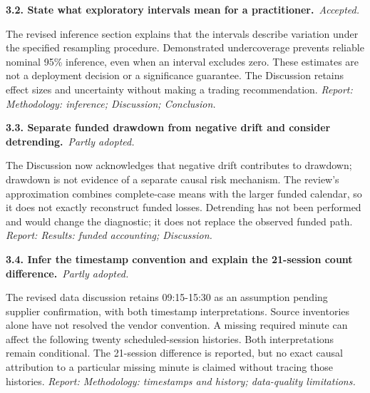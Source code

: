 \documentclass[11pt,a4paper]{article}
\newcommand{\reply}[3]{\par\addvspace{5pt}\noindent\textbf{#1. #2}\ \textit{#3.}\par\nobreak}
\begin{document}
\par\noindent\begin{minipage}{\linewidth}\justifying
\reply{3.2}{State what exploratory intervals mean for a practitioner.}{Accepted}
The revised inference section explains that the intervals describe variation under the specified resampling procedure. Demonstrated undercoverage prevents reliable nominal 95\% inference, even when an interval excludes zero. These estimates are not a deployment decision or a significance guarantee. The Discussion retains effect sizes and uncertainty without making a trading recommendation.
{\small\textit{Report: Methodology: inference; Discussion; Conclusion.}}
\end{minipage}\par\addvspace{5pt}

\par\noindent\begin{minipage}{\linewidth}\justifying
\reply{3.3}{Separate funded drawdown from negative drift and consider detrending.}{Partly adopted}
The Discussion now acknowledges that negative drift contributes to drawdown; drawdown is not evidence of a separate causal risk mechanism. The review's approximation combines complete-case means with the larger funded calendar, so it does not exactly reconstruct funded losses. Detrending has not been performed and would change the diagnostic; it does not replace the observed funded path.
{\small\textit{Report: Results: funded accounting; Discussion.}}
\end{minipage}\par\addvspace{5pt}

\par\noindent\begin{minipage}{\linewidth}\justifying
\reply{3.4}{Infer the timestamp convention and explain the 21-session count difference.}{Partly adopted}
The revised data discussion retains 09:15-15:30 as an assumption pending supplier confirmation, with both timestamp interpretations. Source inventories alone have not resolved the vendor convention. A missing required minute can affect the following twenty scheduled-session histories. Both interpretations remain conditional. The 21-session difference is reported, but no exact causal attribution to a particular missing minute is claimed without tracing those histories.
{\small\textit{Report: Methodology: timestamps and history; data-quality limitations.}}
\end{minipage}\par\addvspace{5pt}
\end{document}
